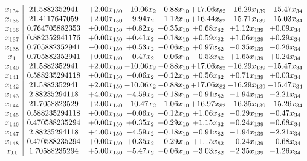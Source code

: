 \documentclass[8pt]{article}
\begin{document}
\[\begin{array}{c| c c@{\hskip 2pt} c@{\hskip 2pt} c@{\hskip 2pt} c@{\hskip 2pt} c@{\hskip 2pt} c@{\hskip 2pt} }
 x_{134}   &  21.5882352941 & +  2.00 x_{150} & -10.06 x_{2} & -0.88 x_{10} & + 17.06 x_{82} & -16.29 x_{139} & -15.47 x_{34}\\
 x_{135}   &  21.4117647059 & +  2.00 x_{150} & -9.94 x_{2} & -1.12 x_{10} & + 16.44 x_{82} & -15.71 x_{139} & -15.03 x_{34}\\
 x_{136}   &  0.764705882353 & +  0.00 x_{150} & +  0.82 x_{2} & +  0.35 x_{10} & +  0.68 x_{82} & +  1.12 x_{139} & +  0.09 x_{34}\\
 x_{137}   &  0.882352941176 & +  0.00 x_{150} & +  0.41 x_{2} & +  0.18 x_{10} & +  0.59 x_{82} & +  1.06 x_{139} & +  0.29 x_{34}\\
 x_{138}   &  0.705882352941 & -0.00 x_{150} & +  0.53 x_{2} & -0.06 x_{10} & +  0.97 x_{82} & -0.35 x_{139} & -0.26 x_{34}\\
 x_{1}   &  0.705882352941 & +  0.00 x_{150} & -0.47 x_{2} & -0.06 x_{10} & -0.53 x_{82} & +  1.65 x_{139} & +  0.24 x_{34}\\
 x_{140}   &  21.5882352941 & +  2.00 x_{150} & -10.06 x_{2} & -0.88 x_{10} & + 17.06 x_{82} & -16.29 x_{139} & -15.47 x_{34}\\
 x_{141}   &  0.588235294118 & +  0.00 x_{150} & -0.06 x_{2} & +  0.12 x_{10} & +  0.56 x_{82} & +  0.71 x_{139} & +  0.03 x_{34}\\
 x_{142}   &  21.5882352941 & +  2.00 x_{150} & -10.06 x_{2} & -0.88 x_{10} & + 17.06 x_{82} & -16.29 x_{139} & -15.47 x_{34}\\
 x_{143}   &  2.88235294118 & +  4.00 x_{150} & -4.59 x_{2} & +  0.18 x_{10} & -0.91 x_{82} & -1.94 x_{139} & -2.21 x_{34}\\
 x_{144}   &  21.7058823529 & +  2.00 x_{150} & -10.47 x_{2} & -1.06 x_{10} & + 16.97 x_{82} & -16.35 x_{139} & -15.26 x_{34}\\
 x_{145}   &  0.588235294118 & +  0.00 x_{150} & -0.06 x_{2} & +  0.12 x_{10} & +  1.06 x_{82} & -0.29 x_{139} & -0.47 x_{34}\\
 x_{146}   &  0.470588235294 & +  0.00 x_{150} & +  0.35 x_{2} & +  0.29 x_{10} & +  1.15 x_{82} & -0.24 x_{139} & -0.68 x_{34}\\
 x_{147}   &  2.88235294118 & +  4.00 x_{150} & -4.59 x_{2} & +  0.18 x_{10} & -0.91 x_{82} & -1.94 x_{139} & -2.21 x_{34}\\
 x_{148}   &  0.470588235294 & +  0.00 x_{150} & +  0.35 x_{2} & +  0.29 x_{10} & +  1.15 x_{82} & -0.24 x_{139} & -0.68 x_{34}\\
 x_{11}   &  1.70588235294 & +  5.00 x_{150} & -5.47 x_{2} & -0.06 x_{10} & -3.03 x_{82} & -2.35 x_{139} & -1.26 x_{34}\\

\end{array}\]
\end{document}
